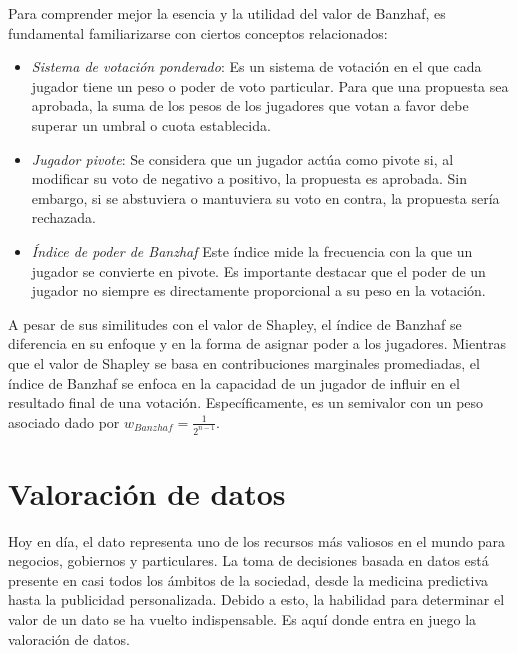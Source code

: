 Para comprender mejor la esencia y la utilidad del valor de
Banzhaf, es fundamental familiarizarse con ciertos conceptos
relacionados:

\begin{itemize}
  \item \emph{Sistema de votación ponderado}: Es un sistema de
  votación en el que cada jugador tiene un peso o poder de voto
  particular. Para que una propuesta sea aprobada, la suma de los
  pesos de los jugadores que votan a favor debe superar un
  umbral o cuota establecida.

  \item \emph{Jugador pivote}: Se considera que un jugador actúa
  como pivote si, al modificar su voto de negativo a positivo,
  la propuesta es aprobada. Sin embargo, si se abstuviera o
  mantuviera su voto en contra, la propuesta sería rechazada.

  \item \emph{Índice de poder de Banzhaf} Este índice mide la
  frecuencia con la que un jugador se convierte en pivote.
  Es importante destacar que el poder de un jugador no siempre
  es directamente proporcional a su peso en la votación.
\end{itemize}

A pesar de sus similitudes con el valor de Shapley, el índice
de Banzhaf se diferencia en su enfoque y en la forma de asignar
poder a los jugadores.
Mientras que el valor de Shapley se basa en contribuciones
marginales promediadas, el índice de Banzhaf se enfoca en la
capacidad de un jugador de influir en el resultado final de
una votación. Específicamente, es un semivalor
con un peso asociado dado por $w_{Banzhaf} = \frac{1}{2^{n-1}}$.



\newpage
\section{Valoración de datos}

Hoy en día, el dato representa uno de los recursos más
valiosos en el mundo para negocios, gobiernos y particulares.
La toma de decisiones basada en datos está presente en
casi todos los ámbitos de la sociedad, desde la medicina
predictiva hasta la publicidad personalizada. Debido a
esto, la habilidad para determinar el valor de un dato
se ha vuelto indispensable. Es aquí donde entra
en juego la valoración de datos.

